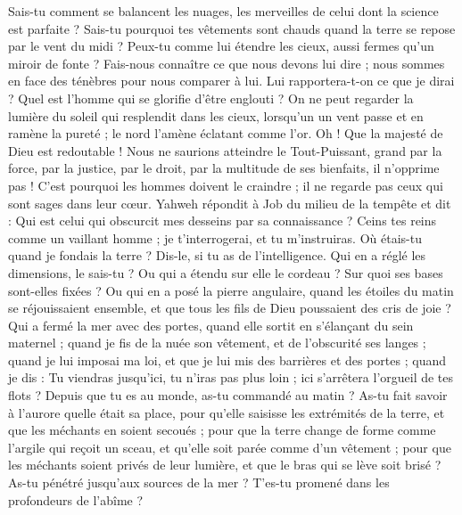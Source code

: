 \begin{multicols}{2}
Sais-tu comment se balancent les nuages, les merveilles de celui dont la science est parfaite ?
Sais-tu pourquoi tes vêtements sont chauds quand la terre se repose par le vent du midi ?
Peux-tu comme lui étendre les cieux, aussi fermes qu'un miroir de fonte ?
Fais-nous connaître ce que nous devons lui dire ; nous sommes en face des ténèbres pour nous comparer à lui.
Lui rapportera-t-on ce que je dirai ? Quel est l'homme qui se glorifie d'être englouti ?
On ne peut regarder la lumière du soleil qui resplendit dans les cieux, lorsqu'un un vent passe et en ramène la pureté ;
le nord l'amène éclatant comme l'or. Oh ! Que la majesté de Dieu est redoutable !
Nous ne saurions atteindre le Tout-Puissant, grand par la force, par la justice, par le droit, par la multitude de ses bienfaits, il n'opprime pas !
C'est pourquoi les hommes doivent le craindre ; il ne regarde pas ceux qui sont sages dans leur cœur.
\VerseOne{}Yahweh répondit à Job du milieu de la tempête et dit :
Qui est celui qui obscurcit mes desseins par sa connaissance ?
Ceins tes reins comme un vaillant homme ; je t'interrogerai, et tu m'instruiras.
Où étais-tu quand je fondais la terre ? Dis-le, si tu as de l'intelligence.
Qui en a réglé les dimensions, le sais-tu ? Ou qui a étendu sur elle le cordeau ?
Sur quoi ses bases sont-elles fixées ? Ou qui en a posé la pierre angulaire,
quand les étoiles du matin se réjouissaient ensemble, et que tous les fils de Dieu poussaient des cris de joie ?
Qui a fermé la mer avec des portes, quand elle sortit en s'élançant du sein maternel ;
quand je fis de la nuée son vêtement, et de l'obscurité ses langes ;
quand je lui imposai ma loi, et que je lui mis des barrières et des portes ;
quand je dis : Tu viendras jusqu'ici, tu n'iras pas plus loin ; ici s'arrêtera l'orgueil de tes flots ?
Depuis que tu es au monde, as-tu commandé au matin ? As-tu fait savoir à l'aurore quelle était sa place,
pour qu'elle saisisse les extrémités de la terre, et que les méchants en soient secoués ;
pour que la terre change de forme comme l'argile qui reçoit un sceau, et qu'elle soit parée comme d'un vêtement ;
pour que les méchants soient privés de leur lumière, et que le bras qui se lève soit brisé ?
As-tu pénétré jusqu'aux sources de la mer ? T'es-tu promené dans les profondeurs de l'abîme ?

\end{multicols}
